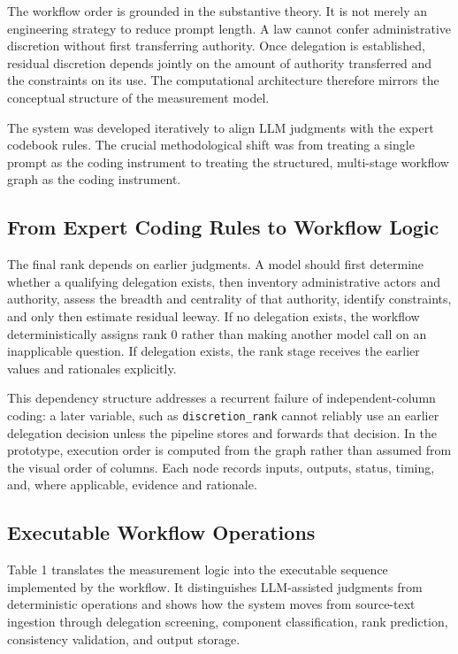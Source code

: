 \documentclass[runningheads]{llncs}
\begin{document}
The workflow order is grounded in the substantive theory. It is not merely an engineering strategy to reduce prompt length. A law cannot confer administrative discretion without first transferring authority. Once delegation is established, residual discretion depends jointly on the amount of authority transferred and the constraints on its use. The computational architecture therefore mirrors the conceptual structure of the measurement model.

The system was developed iteratively to align LLM judgments with the expert codebook rules. The crucial methodological shift was from treating a single prompt as the coding instrument to treating the structured, multi-stage workflow graph as the coding instrument.


\subsection{From Expert Coding Rules to Workflow Logic}

The final rank depends on earlier judgments. A model should first determine whether a qualifying delegation exists, then inventory administrative actors and authority, assess the breadth and centrality of that authority, identify constraints, and only then estimate residual leeway. If no delegation exists, the workflow deterministically assigns rank 0 rather than making another model call on an inapplicable question. If delegation exists, the rank stage receives the earlier values and rationales explicitly.

This dependency structure addresses a recurrent failure of independent-column coding: a later variable, such as \texttt{discretion\_rank} cannot reliably use an earlier delegation decision unless the pipeline stores and forwards that decision. In the prototype, execution order is computed from the graph rather than assumed from the visual order of columns. Each node records inputs, outputs, status, timing, and, where applicable, evidence and rationale.

\subsection{Executable Workflow Operations}

Table 1 translates the measurement logic into the executable sequence implemented by the workflow. It distinguishes LLM-assisted judgments from deterministic operations and shows how the system moves from source-text ingestion through delegation screening, component classification, rank prediction, consistency validation, and output storage.
 
\end{document}
